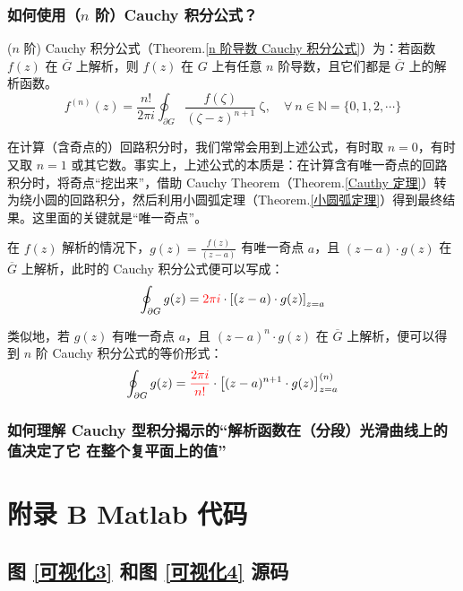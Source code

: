 \documentclass[UTF8]{report}
\def\N{\mathbb{N}}
\theoremstyle{MyLineTheoremStyle} %
\theoremstyle{MyBlockTheoremStyle} %
\theoremstyle{MySubsubsectionStyle} %
\begin{document}
\subsection{如何使用（$n$ 阶）Cauchy 积分公式？}

($n$ 阶) Cauchy 积分公式（Theorem.\ref{n 阶导数 Cauchy 积分公式}）为：若函数 $f(z)$ 在 $\overline{G}$ 上解析，则 $f(z)$ 在 $G$ 上有任意 $n$ 阶导数，且它们都是 $\overline{G}$ 上的解析函数。
\begin{equation}
f^{(n)}(z) = \frac{n !}{2\pi i} \oint_{\partial G} \frac{f(\zeta)}{(\zeta - z )^{n+1}} \ \mathrm{\zeta},\quad \forall\ n \in \N = \{0, 1, 2, \cdots\}
\end{equation}

在计算（含奇点的）回路积分时，我们常常会用到上述公式，有时取 $n = 0$，有时又取 $n =1$ 或其它数。事实上，上述公式的本质是：在计算含有唯一奇点的回路积分时，将奇点“挖出来”，借助 Cauchy Theorem（Theorem.\ref{Cauthy 定理}）转为绕小圆的回路积分，然后利用小圆弧定理（Theorem.\ref{小圆弧定理}）得到最终结果。这里面的关键就是“唯一奇点”。

在 $f(z)$ 解析的情况下，$g(z) = \frac{f(z)}{(z - a)}$ 有唯一奇点 $a$，且 $(z - a)\cdot g(z) $ 在 $\overline{G}$ 上解析，此时的 Cauchy 积分公式便可以写成：
\begin{equation}
\oint_{\partial G} g(z) = {\color{red} 2\pi i }\cdot \left[ (z - a)\cdot g(z) \right]_{z = a}
\end{equation}

类似地，若 $g(z)$ 有唯一奇点 $a$，且 $(z - a)^n\cdot g(z) $ 在 $\overline{G}$ 上解析，便可以得到 $n$ 阶 Cauchy 积分公式的等价形式：
\begin{equation}
    \oint_{\partial G} g(z) = {\color{red} \frac{2\pi i}{n!}} \cdot \left[ (z - a)^{n+1}\cdot g(z) \right]^{(n)}_{z = a}
\end{equation}

\subsection{如何理解 Cauchy 型积分揭示的“解析函数在（分段）光滑曲线上的值决定了它 在整个复平面上的值”}

\chapter*{附录 B\hspace*{20pt}  Matlab 代码}
\thispagestyle{fancy}
\setcounter{chapter}{2} 
\setcounter{equation}{0}    %
\setcounter{section}{0}   
\renewcommand\thesection{B.\arabic{section}}   
\renewcommand{\thefigure}{B.\arabic{figure}} 
\renewcommand{\thetable}{B.\arabic{table}}

\section{图 \ref{可视化3} 和图 \ref{可视化4} 源码}
\label{可视化34 源码}


\end{document}
